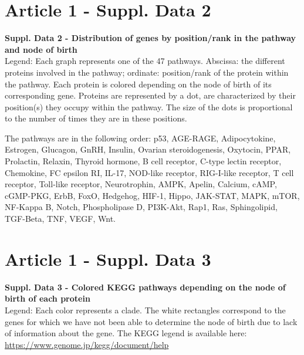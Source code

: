 \section{Article 1 - Suppl. Data 2}
\textbf{Suppl. Data 2 - Distribution of genes by position/rank in the pathway and node of birth}\\
Legend: Each graph represents one of the 47 pathways. Abscissa: the different proteins involved in the pathway; ordinate: position/rank of the protein within the pathway. Each protein is colored depending on the node of birth of its corresponding gene. Proteins are represented by a dot, are characterized by their position(s) they occupy within the pathway. The size of the dots is proportional to the number of times they are in these positions.
\par The pathways are in the following order:
p53, AGE-RAGE, Adipocytokine, Estrogen, Glucagon, GnRH, Insulin, Ovarian steroidogenesis, Oxytocin, PPAR, Prolactin, Relaxin, Thyroid hormone, B cell receptor, C-type lectin receptor, Chemokine, FC epsilon RI, IL-17, NOD-like receptor, RIG-I-like receptor, T cell receptor, Toll-like receptor, Neurotrophin, AMPK, Apelin, Calcium, cAMP, cGMP-PKG, ErbB, FoxO, Hedgehog, HIF-1, Hippo, JAK-STAT, MAPK, mTOR, NF-Kappa B, Notch, Phospholipase D, PI3K-Akt, Rap1, Ras, Sphingolipid, TGF-Beta, TNF, VEGF, Wnt.



\section{Article 1 - Suppl. Data 3}
\textbf{Suppl. Data 3 - Colored KEGG pathways depending on the node of birth of each protein}\\
Legend: Each color represents a clade. The white rectangles correspond to the genes for which we have not been able to determine the node of birth due to lack of information about the gene. The KEGG legend is available here: \href{https://www.genome.jp/kegg/document/help_pathway.html}{https://www.genome.jp/kegg/document/help}
